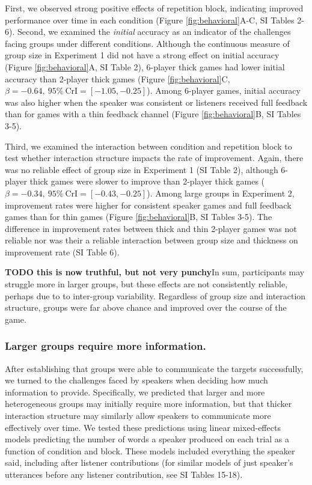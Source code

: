 \documentclass[
  english,
]{article}
\begin{document}
First, we observed strong positive effects of repetition block, indicating improved performance over time in each condition (Figure \ref{fig:behavioral}A-C, SI Tables 2-6).
Second, we examined the \emph{initial} accuracy as an indicator of the challenges facing groups under different conditions.
Although the continuous measure of group size in Experiment 1 did not have a strong effect on initial accuracy (Figure \ref{fig:behavioral}A, SI Table 2), 6-player thick games had lower initial accuracy than 2-player thick games (Figure \ref{fig:behavioral}C, \(\beta=-0.64,\:95\%\:\mathrm{CrI}=[-1.05, -0.25]\)). Among 6-player games, initial accuracy was also higher when the speaker was consistent or listeners received full feedback than for games with a thin feedback channel (Figure \ref{fig:behavioral}B, SI Tables 3-5).

Third, we examined the interaction between condition and repetition block to test whether interaction structure impacts the rate of improvement.
Again, there was no reliable effect of group size in Experiment 1 (SI Table 2), although 6-player thick games were slower to improve than 2-player thick games (\(\beta=-0.34,\:95\%\:\mathrm{CrI}=[-0.43, -0.25]\)).
Among large groups in Experiment 2, improvement rates were higher for consistent speaker games and full feedback games than for thin games (Figure \ref{fig:behavioral}B, SI Tables 3-5).
The difference in improvement rates between thick and thin 2-player games was not reliable nor was their a reliable interaction between group size and thickness on improvement rate (SI Table 6).

\textbf{TODO this is now truthful, but not very punchy}In sum, participants may struggle more in larger groups, but these effects are not consistently reliable, perhaps due to to inter-group variability. Regardless of group size and interaction structure, groups were far above chance and improved over the course of the game.

\hypertarget{larger-groups-require-more-information.}{%
\subsubsection{Larger groups require more information.}\label{larger-groups-require-more-information.}}

After establishing that groups were able to communicate the targets successfully, we turned to the challenges faced by speakers when deciding how much information to provide.
Specifically, we predicted that larger and more heterogeneous groups may initially require more information, but that thicker interaction structure may similarly allow speakers to communicate more effectively over time.
We tested these predictions using linear mixed-effects models predicting the number of words a speaker produced on each trial as a function of condition and block. These models included everything the speaker said, including after listener contributions (for similar models of just speaker's utterances before any listener contribution, see SI Tables 15-18).
\end{document}
